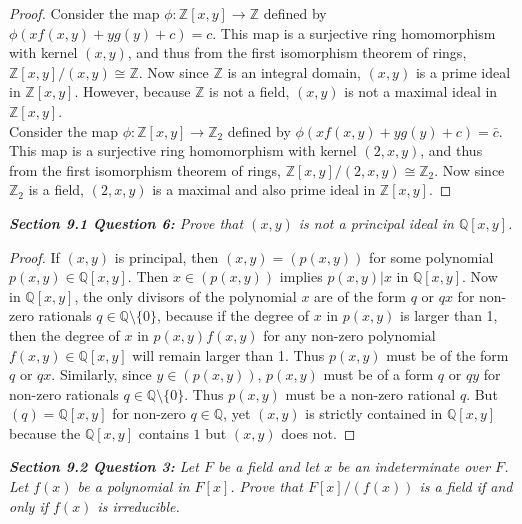 \documentclass{article}
\begin{document}
  \begin{proof}
    Consider the map $\phi:\mathbb{Z}[x,y]\rightarrow\mathbb{Z}$
    defined by $\phi(xf(x,y)+yg(y)+c)=c$. This map is a surjective ring
    homomorphism with kernel $(x,y)$, and thus from the first isomorphism
    theorem of rings, $\mathbb{Z}[x,y]/(x,y)\cong\mathbb{Z}$. Now since
    $\mathbb{Z}$ is an integral domain, $(x,y)$ is a prime ideal in
    $\mathbb{Z}[x,y]$. However, because $\mathbb{Z}$ is not a field,
    $(x,y)$ is not a maximal ideal in $\mathbb{Z}[x,y]$. \\

    Consider the map $\phi:\mathbb{Z}[x,y]\rightarrow\mathbb{Z}_2$
    defined by $\phi(xf(x,y)+yg(y)+c)=\bar{c}$. This map is a surjective ring
    homomorphism with kernel $(2,x,y)$, and thus from the first isomorphism
    theorem of rings, $\mathbb{Z}[x,y]/(2,x,y)\cong\mathbb{Z}_2$. Now since
    $\mathbb{Z}_2$ is a field, $(2,x,y)$ is a maximal and also prime ideal in
    $\mathbb{Z}[x,y]$.
  \end{proof}

\it \textbf{Section 9.1 Question 6:} Prove that $(x,y)$ is not a principal
  ideal in $\mathbb{Q}[x,y]$.

  \begin{proof}
    If $(x,y)$ is principal, then $(x,y)=(p(x,y))$ for some polynomial
    $p(x,y)\in\mathbb{Q}[x,y]$. Then $x\in(p(x,y))$ implies $p(x,y)|x$ in
    $\mathbb{Q}[x,y]$. Now in $\mathbb{Q}[x,y]$, the only divisors of the
    polynomial $x$ are of the form $q$ or $qx$ for non-zero rationals
    $q\in\mathbb{Q}\setminus\{0\}$, because if the degree of $x$ in
    $p(x,y)$ is larger than 1, then the degree of $x$ in $p(x,y)f(x,y)$ for
    any non-zero polynomial $f(x,y)\in\mathbb{Q}[x,y]$ will remain larger
    than 1. Thus $p(x,y)$ must be of the form $q$ or $qx$.  Similarly,
    since $y\in(p(x,y))$, $p(x,y)$ must be of a form $q$ or $qy$ for
    non-zero rationals $q\in\mathbb{Q}\setminus\{0\}$. Thus $p(x,y)$ must
    be a non-zero rational $q$. But $(q)=\mathbb{Q}[x,y]$ for non-zero
    $q\in\mathbb{Q}$, yet $(x,y)$ is strictly contained in
    $\mathbb{Q}[x,y]$ because the $\mathbb{Q}[x,y]$ contains $1$ but
    $(x,y)$ does not.
  \end{proof}

\it \textbf{Section 9.2 Question 3:} Let $F$ be a field and let $x$ be an
  indeterminate over $F$. Let $f(x)$ be a polynomial in $F[x]$. Prove that
  $F[x]/(f(x))$ is a field if and only if $f(x)$ is irreducible.
\end{document}
